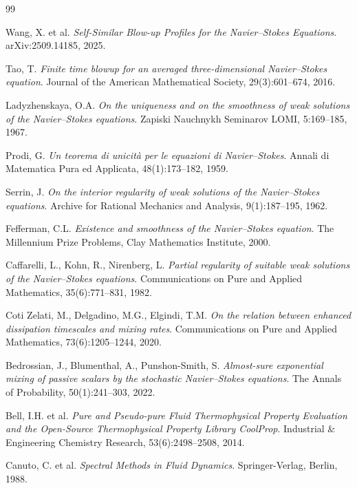 \documentclass[11pt, a4paper]{article}
\theoremstyle{definition}
\theoremstyle{remark}
\begin{document}
\clearpage
\begin{thebibliography}{99}

  Wang, X. et al.
  \textit{Self-Similar Blow-up Profiles for the Navier--Stokes Equations}.
  arXiv:2509.14185, 2025.

  Tao, T.
  \textit{Finite time blowup for an averaged three-dimensional Navier--Stokes equation}.
  Journal of the American Mathematical Society, 29(3):601--674, 2016.

  Ladyzhenskaya, O.A.
  \textit{On the uniqueness and on the smoothness of weak solutions of the
  Navier--Stokes equations}.
  Zapiski Nauchnykh Seminarov LOMI, 5:169--185, 1967.

  Prodi, G.
  \textit{Un teorema di unicità per le equazioni di Navier--Stokes}.
  Annali di Matematica Pura ed Applicata, 48(1):173--182, 1959.

  Serrin, J.
  \textit{On the interior regularity of weak solutions of the Navier--Stokes equations}.
  Archive for Rational Mechanics and Analysis, 9(1):187--195, 1962.

  Fefferman, C.L.
  \textit{Existence and smoothness of the Navier--Stokes equation}.
  The Millennium Prize Problems, Clay Mathematics Institute, 2000.

  Caffarelli, L., Kohn, R., Nirenberg, L.
  \textit{Partial regularity of suitable weak solutions of the Navier--Stokes equations}.
  Communications on Pure and Applied Mathematics, 35(6):771--831, 1982.

  Coti Zelati, M., Delgadino, M.G., Elgindi, T.M.
  \textit{On the relation between enhanced dissipation timescales and mixing rates}.
  Communications on Pure and Applied Mathematics, 73(6):1205--1244, 2020.

  Bedrossian, J., Blumenthal, A., Punshon-Smith, S.
  \textit{Almost-sure exponential mixing of passive scalars by the stochastic
  Navier--Stokes equations}.
  The Annals of Probability, 50(1):241--303, 2022.

  Bell, I.H. et al.
  \textit{Pure and Pseudo-pure Fluid Thermophysical Property Evaluation and
  the Open-Source Thermophysical Property Library CoolProp}.
  Industrial \& Engineering Chemistry Research, 53(6):2498--2508, 2014.

  Canuto, C. et al.
  \textit{Spectral Methods in Fluid Dynamics}.
  Springer-Verlag, Berlin, 1988.

\end{thebibliography}
\end{document}
